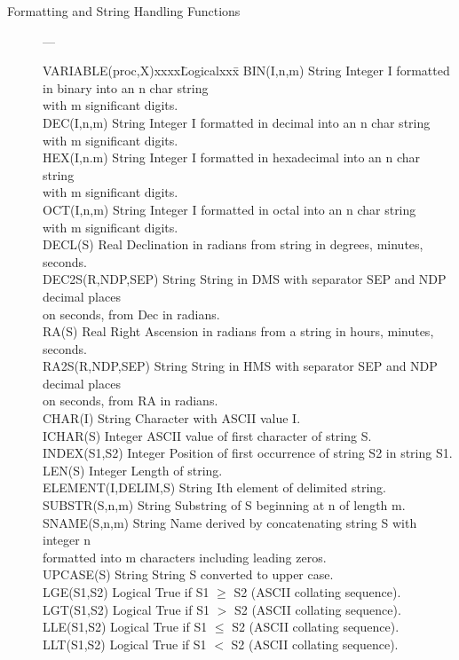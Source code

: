 \begin{description}
\item [Formatting and String Handling Functions] ---

\begin{tabbing}
VARIABLE(proc,X)xxxx\=Logicalxxx\=\kill
BIN(I,n,m) \> String \> Integer I formatted in binary into an n char string \\
 \> \> with m significant digits. \\
DEC(I,n,m) \> String \> Integer I formatted in decimal into an n char string \\
 \> \> with m significant digits. \\
HEX(I,n.m) \> String \> Integer I formatted in hexadecimal into an n char string \\
 \> \> with m significant digits. \\
OCT(I,n,m) \> String \> Integer I formatted in octal into an n char string \\
 \> \> with m significant digits. \\
DECL(S) \> Real \> Declination in radians from string in degrees, minutes, seconds. \\
DEC2S(R,NDP,SEP) \> String \> String in DMS with separator SEP and NDP decimal places \\
 \> \> on seconds, from Dec in radians. \\
RA(S) \> Real \> Right Ascension in radians from a string in hours, minutes, seconds. \\
RA2S(R,NDP,SEP) \> String \> String in HMS with separator SEP and NDP decimal places \\
 \> \> on seconds, from RA in radians. \\
CHAR(I) \> String \> Character with ASCII value I. \\
ICHAR(S) \> Integer \> ASCII value of first character of string S. \\
INDEX(S1,S2) \> Integer \> Position of first occurrence of string S2 in string
 S1.\\
LEN(S) \> Integer \> Length of string. \\
ELEMENT(I,DELIM,S) \> String \> Ith element of delimited string. \\
SUBSTR(S,n,m) \> String \> Substring of S beginning at n of length m. \\
SNAME(S,n,m) \> String \> Name derived by concatenating string S with integer n \\
 \> \>          formatted into m characters including leading zeros. \\
UPCASE(S) \> String \> String S converted to upper case. \\
LGE(S1,S2) \> Logical \> True if S1 $\geq$ S2 (ASCII collating sequence). \\
LGT(S1,S2) \> Logical \> True if S1 $>$ S2 (ASCII collating sequence). \\
LLE(S1,S2) \> Logical \> True if S1 $\leq$ S2 (ASCII collating sequence). \\
LLT(S1,S2) \> Logical \> True if S1 $<$ S2 (ASCII collating sequence). \\
\end{tabbing}


\end{description}
